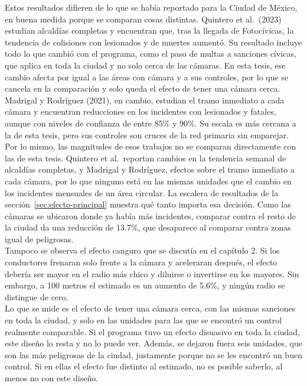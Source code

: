 Estos resultados difieren de lo que se había reportado para la Ciudad de México, en buena medida porque se comparan cosas distintas. Quintero et al.\ (2023) estudian alcaldías completas y encuentran que, tras la llegada de Fotocívicas, la tendencia de colisiones con lesionados y de muertes aumentó. Su resultado incluye todo lo que cambió con el programa, como el paso de multas a sanciones cívicas, que aplica en toda la ciudad y no solo cerca de las cámaras. En esta tesis, ese cambio afecta por igual a las áreas con cámara y a sus controles, por lo que se cancela en la comparación y solo queda el efecto de tener una cámara cerca. Madrigal y Rodríguez (2021), en cambio, estudian el tramo inmediato a cada cámara y encuentran reducciones en los incidentes con lesionados y fatales, aunque con niveles de confianza de entre 85\% y 90\%. Su escala es más cercana a la de esta tesis, pero sus controles son cruces de la red primaria sin emparejar. Por lo mismo, las magnitudes de esos trabajos no se comparan directamente con las de esta tesis. Quintero et al.\ reportan cambios en la tendencia semanal de alcaldías completas, y Madrigal y Rodríguez, efectos sobre el tramo inmediato a cada cámara, por lo que ninguno está en las mismas unidades que el cambio en los incidentes mensuales de un área circular. La escalera de resultados de la sección~\ref{sec:efecto-principal} muestra qué tanto importa esa decisión. Como las cámaras se ubicaron donde ya había más incidentes, comparar contra el resto de la ciudad da una reducción de 13.7\%, que desaparece al comparar contra zonas igual de peligrosas.\\

Tampoco se observa el efecto canguro que se discutía en el capítulo 2. Si los conductores frenaran solo frente a la cámara y aceleraran después, el efecto debería ser mayor en el radio más chico y diluirse o invertirse en los mayores. Sin embargo, a 100 metros el estimado es un aumento de 5.6\%, y ningún radio se distingue de cero.\\

Lo que se mide es el efecto de tener una cámara cerca, con las mismas sanciones en toda la ciudad, y solo en las unidades para las que se encontró un control realmente comparable. Si el programa tuvo un efecto disuasivo en toda la ciudad, este diseño lo resta y no lo puede ver. Además, se dejaron fuera seis unidades, que son las más peligrosas de la ciudad, justamente porque no se les encontró un buen control. Si en ellas el efecto fue distinto al estimado, no es posible saberlo, al menos no con este diseño.\\

